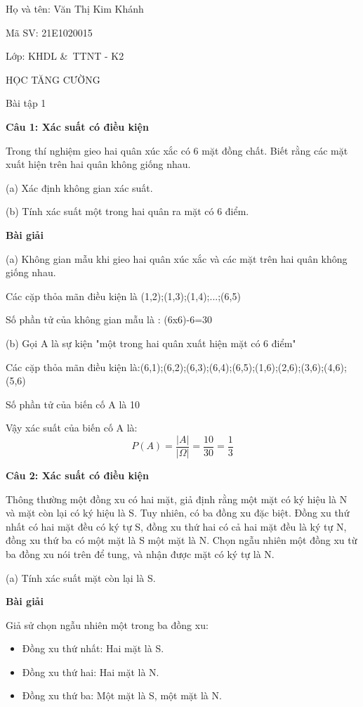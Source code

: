 \documentclass[10pt,a4paper]{article}
\begin{document}
\begin{flushleft}
	Họ và tên: Văn Thị Kim Khánh


	Mã SV: 21E1020015


	Lớp: KHDL \&\ TTNT - K2
\end{flushleft}
\begin{center}
		HỌC TĂNG CƯỜNG
		
		
		Bài tập 1
\end{center}
\textbf{Câu 1: Xác suất có điều kiện}


Trong thí nghiệm gieo hai quân xúc xắc có 6 mặt đồng chất. Biết rằng các mặt xuất hiện trên hai quân không giống nhau.


(a) Xác định không gian xác suất.


(b) Tính xác suất một trong hai quân ra mặt có 6 điểm.


\textbf{Bài giải}


(a) Không gian mẫu khi gieo hai quân xúc xắc và các mặt trên hai quân không giống nhau.

Các cặp thỏa mãn điều kiện là (1,2);(1,3);(1,4);...;(6,5)


Số phần tử của không gian mẫu là : (6x6)-6=30

(b) Gọi A là sự kiện "một trong hai quân xuất hiện mặt có 6 điểm"


Các cặp thỏa mãn điều kiện là:(6,1);(6,2);(6,3);(6,4);(6,5);(1,6);(2,6);(3,6);(4,6);(5,6)


Số phần tử của biến cố A là 10


Vậy xác suất của biến cố A là:
\[
P(A) = \frac{|A|}{|\Omega|} = \frac{10}{30} = \frac{1}{3}
\]


\textbf{Câu 2: Xác suất có điều kiện}


Thông thường một đồng xu có hai mặt, giả định rằng một mặt có ký hiệu là N và mặt còn lại có ký hiệu là S. Tuy nhiên, có ba đồng xu đặc biệt. Đồng xu thứ nhất có hai mặt đều có ký tự S, đồng xu thứ hai có cả hai mặt đều là ký tự N, đồng xu thứ ba có một mặt là S một mặt là N. Chọn ngẫu nhiên một đồng xu từ ba đồng xu nói trên để tung, và nhận được mặt có ký tự là N.


(a) Tính xác suất mặt còn lại là S.

\textbf{Bài giải}

Giả sử chọn ngẫu nhiên một trong ba đồng xu:
\begin{itemize}
	\item Đồng xu thứ nhất: Hai mặt là S.
	\item Đồng xu thứ hai: Hai mặt là N.
	\item Đồng xu thứ ba: Một mặt là S, một mặt là N.
\end{itemize}
\end{document}
